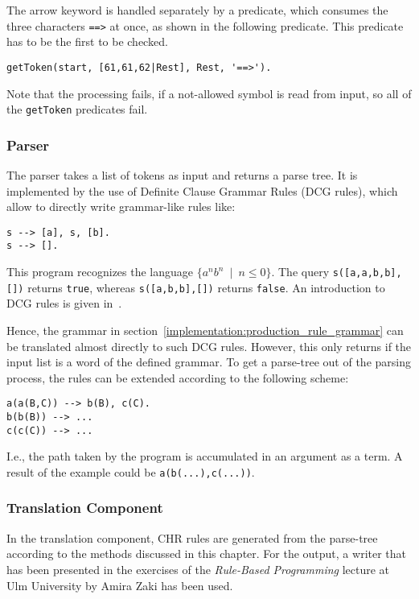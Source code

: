 The arrow keyword is handled separately by a predicate, which consumes the three characters \lstinline|==>| at once, as shown in the following predicate. This predicate has to be the first to be checked.

\begin{lstlisting}
getToken(start, [61,61,62|Rest], Rest, '==>').
\end{lstlisting}

Note that the processing fails, if a not-allowed symbol is read from input, so all of the \lstinline|getToken| predicates fail.

\subsubsection{Parser}

The parser takes a list of tokens as input and returns a parse tree. It is implemented by the use of Definite Clause Grammar Rules (DCG rules), which allow to directly write grammar-like rules like:

\begin{lstlisting}
s --> [a], s, [b].
s --> [].
\end{lstlisting}

This program recognizes the language $\{ a^nb^n \enspace | \enspace n \leq 0 \}$. The query \lstinline|s([a,a,b,b],[])| returns \lstinline|true|, whereas \lstinline|s([a,b,b],[])| returns \lstinline|false|. An introduction to DCG rules is given in~\cite{ogb_dcg}.

Hence, the grammar in section~\ref{implementation:production_rule_grammar} can be translated almost directly to such DCG rules. However, this only returns if the input list is a word of the defined grammar. To get a parse-tree out of the parsing process, the rules can be extended according to the following scheme:

\begin{lstlisting}
a(a(B,C)) --> b(B), c(C).
b(b(B)) --> ...
c(c(C)) --> ...
\end{lstlisting}

I.e., the path taken by the program is accumulated in an argument as a term. A result of the example could be \lstinline|a(b(...),c(...))|.

\subsubsection{Translation Component}

In the translation component, CHR rules are generated from the parse-tree according to the methods discussed in this chapter. For the output, a writer that has been presented in the exercises of the \emph{Rule-Based Programming} lecture at Ulm University by Amira Zaki \cite{chr_homepage} has been used.

